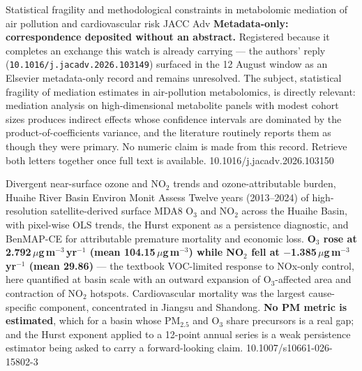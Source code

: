 \documentclass[10pt]{article}
\begin{document}
{Statistical fragility and methodological constraints in metabolomic mediation of air pollution and cardiovascular risk}
{JACC Adv}
{\textbf{Metadata-only: correspondence deposited without an abstract.} Registered because it
completes an exchange this watch is already carrying --- the authors' reply
(\texttt{10.1016/j.jacadv.2026.103149}) surfaced in the 12 August window as an
Elsevier metadata-only record and remains unresolved. The subject, statistical fragility of
mediation estimates in air-pollution metabolomics, is directly relevant: mediation analysis
on high-dimensional metabolite panels with modest cohort sizes produces indirect effects
whose confidence intervals are dominated by the product-of-coefficients variance, and the
literature routinely reports them as though they were primary. No numeric claim is made from
this record. Retrieve both letters together once full text is available.}
{10.1016/j.jacadv.2026.103150}


{Divergent near-surface ozone and NO$_2$ trends and ozone-attributable burden, Huaihe River Basin}
{Environ Monit Assess}
{Twelve years (2013--2024) of high-resolution satellite-derived surface MDA8 O$_3$ and
NO$_2$ across the Huaihe Basin, with pixel-wise OLS trends, the Hurst exponent as a
persistence diagnostic, and BenMAP-CE for attributable premature mortality and economic
loss. \textbf{O$_3$ rose at 2.792\,$\mu$g\,m$^{-3}$\,yr$^{-1}$ (mean
104.15\,$\mu$g\,m$^{-3}$) while NO$_2$ fell at $-$1.385\,$\mu$g\,m$^{-3}$\,yr$^{-1}$ (mean
29.86)} --- the textbook VOC-limited response to NOx-only control, here quantified at basin
scale with an outward expansion of O$_3$-affected area and contraction of NO$_2$ hotspots.
Cardiovascular mortality was the largest cause-specific component, concentrated in Jiangsu
and Shandong. \textbf{No PM metric is estimated}, which for a basin whose PM$_{2.5}$ and
O$_3$ share precursors is a real gap; and the Hurst exponent applied to a 12-point annual
series is a weak persistence estimator being asked to carry a forward-looking claim.}
{10.1007/s10661-026-15802-3}
\end{document}
